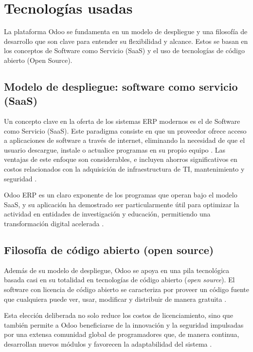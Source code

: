 \documentclass[12pt,letterpaper,spanish]{report}
\begin{document}
\section{Tecnologías usadas}
\label{sec:tecnologias_usadas}
La plataforma Odoo se fundamenta en un modelo de despliegue y una filosofía de desarrollo que son clave para entender su flexibilidad y alcance. Estos se basan en los conceptos de Software como Servicio (SaaS) y el uso de tecnologías de código abierto (Open Source).

\subsection{Modelo de despliegue: software como servicio (SaaS)}

Un concepto clave en la oferta de los sistemas ERP modernos es el de Software como Servicio (SaaS). Este paradigma consiste en que un proveedor ofrece acceso a aplicaciones de software a través de internet, eliminando la necesidad de que el usuario descargue, instale o actualice programas en su propio equipo \cite{dura2022saas}. Las ventajas de este enfoque son considerables, e incluyen ahorros significativos en costos relacionados con la adquisición de infraestructura de TI, mantenimiento y seguridad \cite{dura2022saas}.

Odoo ERP es un claro exponente de los programas que operan bajo el modelo SaaS, y su aplicación ha demostrado ser particularmente útil para optimizar la actividad en entidades de investigación y educación, permitiendo una transformación digital acelerada \cite{dura2022saas}.

\subsection{Filosofía de código abierto (open source)}

Además de su modelo de despliegue, Odoo se apoya en una pila tecnológica basada casi en su totalidad en tecnologías de código abierto (\textit{open source}). El software con licencia de código abierto se caracteriza por proveer un código fuente que cualquiera puede ver, usar, modificar y distribuir de manera gratuita \cite{pretell2024mejora}.

Esta elección deliberada no solo reduce los costos de licenciamiento, sino que también permite a Odoo beneficiarse de la innovación y la seguridad impulsadas por una extensa comunidad global de programadores que, de manera continua, desarrollan nuevos módulos y favorecen la adaptabilidad del sistema \cite{pretell2024mejora}.
\end{document}
